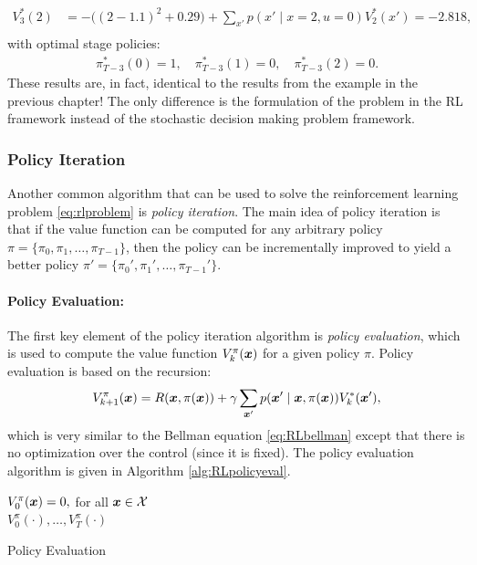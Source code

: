 \begin{example}
\begin{equation*}
\begin{split}
V^*_3(2) &= -\big((2 - 1.1)^2 + 0.29\big)  + \sum_{x'} p(x' \mid x=2, u=0)V^*_2(x') = -2.818,\\
\end{split}
\end{equation*}
with optimal stage policies:
\begin{equation*}
\begin{split}
\pi^*_{T-3}(0) = 1, \quad \pi^*_{T-3}(1) = 0, \quad \pi^*_{T-3}(2) = 0. 
\end{split}
\end{equation*}
These results are, in fact, identical to the results from the example in the previous chapter! The only difference is the formulation of the problem in the RL framework instead of the stochastic decision making problem framework.
\end{example}


\subsubsection{Policy Iteration}
Another common algorithm that can be used to solve the reinforcement learning problem \eqref{eq:rlproblem} is \textit{policy iteration}. The main idea of policy iteration is that if the value function can be computed for any arbitrary policy $\pi=\{\pi_0, \pi_1, \dots, \pi_{T-1}\}$, then the policy can be incrementally improved to yield a better policy $\pi'=\{\pi_0', \pi_1', \dots, \pi_{T-1}'\}$.

\paragraph{Policy Evaluation:}
The first key element of the policy iteration algorithm is \textit{policy evaluation}, which is used to compute the value function $V_k^\pi(\bm{x})$ for a given policy $\pi$. Policy evaluation is based on the recursion:
\begin{equation} \label{eq:RLpolicyeval}
V^\pi_{k+1}(\bm{x}) = R(\bm{x}, \pi(\bm{x})) + \gamma \sum_{\bm{x}'} p(\bm{x}' \mid \bm{x}, \pi(\bm{x})) V^*_{k}(\bm{x}'),
\end{equation}
which is very similar to the Bellman equation \eqref{eq:RLbellman} except that there is no optimization over the control (since it is fixed). The policy evaluation algorithm is given in Algorithm \ref{alg:RLpolicyeval}.
\begin{algorithm}[ht]
 \KwData{$\pi$}
 $V_0^\pi(\bm{x}) = 0,$ for all $\bm{x} \in \mathcal{X}$\\
 \Return $V^\pi_0(\cdot),\dots,V^\pi_T(\cdot)$
 \caption{Policy Evaluation}
 \label{alg:RLpolicyeval}
\end{algorithm}

